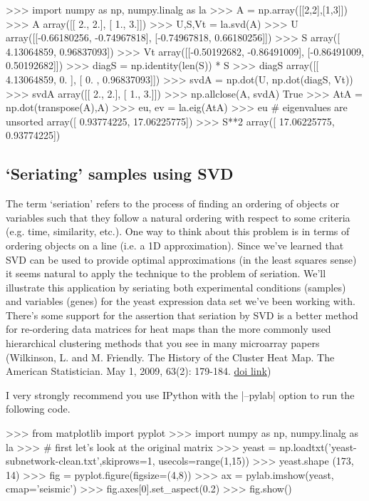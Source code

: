 \begin{python}
>>> import numpy as np, numpy.linalg as la
>>> A = np.array([[2,2],[1,3]])
>>> A
array([[ 2.,  2.],
       [ 1.,  3.]])
>>> U,S,Vt = la.svd(A)
>>> U
array([[-0.66180256, -0.74967818],
       [-0.74967818,  0.66180256]])
>>> S
array([ 4.13064859,  0.96837093])
>>> Vt
array([[-0.50192682, -0.86491009],
       [-0.86491009,  0.50192682]])
>>> diagS = np.identity(len(S)) * S
>>> diagS
array([[ 4.13064859,  0.        ],
       [ 0.        ,  0.96837093]])
>>> svdA = np.dot(U, np.dot(diagS, Vt))
>>> svdA
array([[ 2.,  2.],
       [ 1.,  3.]])
>>> np.allclose(A, svdA)
True
>>> AtA = np.dot(transpose(A),A)
>>> eu, ev = la.eig(AtA)
>>> eu  # eigenvalues are unsorted
array([  0.93774225,  17.06225775])
>>> S**2
array([ 17.06225775,   0.93774225])
\end{python}


\subsection{`Seriating' samples using SVD}

The term `seriation' refers to the process of finding an ordering of objects or variables such that they follow a natural ordering with respect to some criteria (e.g. time, similarity, etc.). One way to think about this problem is in terms of ordering objects on a line (i.e. a 1D approximation).  Since we've learned that SVD can be used to provide optimal approximations (in the least squares sense) it seems natural to apply the technique to the problem of seriation. We'll illustrate this application by seriating both experimental conditions (samples) and variables (genes) for the yeast expression data set we've been working with.  There's some support for the assertion that seriation by SVD is a better method for re-ordering data matrices for heat maps than the more commonly used hierarchical clustering methods that you see in many microarray papers (Wilkinson, L. and M. Friendly. The History of the Cluster Heat Map. The American Statistician. May 1, 2009, 63(2): 179-184. \href{http://dx.doi.org/10.1198/tas.2009.0033}{doi link}) 

{\color{DarkRed} I very strongly recommend you use IPython with the |--pylab| option to run the following code.}

\begin{python}
>>> from matplotlib import pyplot
>>> import numpy as np, numpy.linalg as la
>>> # first let's look at the original matrix
>>> yeast = np.loadtxt('yeast-subnetwork-clean.txt',skiprows=1, usecols=range(1,15))
>>> yeast.shape
(173, 14)
>>> fig = pyplot.figure(figsize=(4,8))
>>> ax = pylab.imshow(yeast, cmap='seismic')
>>> fig.axes[0].set_aspect(0.2)
>>> fig.show() 
\end{python}


